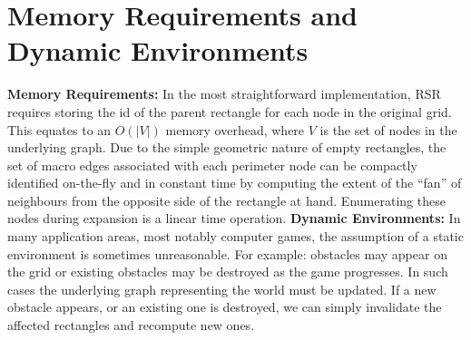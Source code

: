 \section{Memory Requirements and Dynamic Environments}
\label{cha::rsr::memory}
\textbf{Memory Requirements: }
In the most straightforward implementation, RSR requires storing the id of the
parent rectangle for each node in the original grid. 
This equates to an $O(|V|)$ memory overhead, where $V$ is the set of nodes
in the underlying graph.
Due to the simple geometric nature of empty rectangles, the set of macro
edges associated with each perimeter node can be compactly identified 
on-the-fly and in constant time by computing the extent of the ``fan'' of
neighbours from the opposite side of the rectangle at hand. Enumerating 
these nodes during expansion is a linear time operation.
\newline \noindent
\textbf{Dynamic Environments: }
In many application areas, most notably computer games, the assumption of a
static environment is sometimes unreasonable.  For example: obstacles may
appear on the grid or existing obstacles may be destroyed as the game
progresses.  In such cases the underlying graph representing the world must be
updated.  If a new obstacle appears, or an existing one is destroyed, we can
simply invalidate the affected rectangles and recompute new ones.

